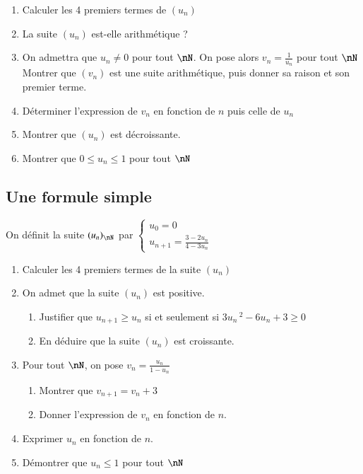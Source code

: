 \documentclass[oneside,12pt]{article}          %
\begin{document}
\begin{enumerate}
    \item Calculer les 4 premiers termes de $(u_n)$
    \item La suite $(u_n)$ est-elle arithmétique ?
    \item On admettra que $u_n\neq 0$ pour tout $\nN$. On pose alors $v_{n}=\frac{1}{u_n}$ pour tout $\nN$
    Montrer que $(v_{n})$ est une suite arithmétique, puis donner sa raison et son premier terme.
    \item Déterminer l'expression de $v_{n}$ en fonction de $n$ puis celle de $u_n$
    \item Montrer que $(u_n)$ est décroissante.
    \item Montrer que $0\leq u_n\leq 1$ pour tout $\nN$
\end{enumerate}



\subsection{Une formule simple}
On définit la suite $(u_n)_{\nN}$ par $\begin{cases}u_0=0\\u_{n+1}=\frac{3-2u_n}{4-3u_n}\end{cases}$
\begin{enumerate}
	\item Calculer les 4 premiers termes de la suite $(u_n)$
	\item On admet que la suite $(u_n)$ est positive.
	\begin{enumerate}
		\item Justifier que $u_{n+1}\geq u_n$ si et seulement si $3u_n\,^2-6u_n+3\geq0$
		\item En déduire que la suite $(u_n)$ est croissante.
	\end{enumerate}
	\item Pour tout $\nN$, on pose $v_n=\frac{u_n}{1-u_n}$
	\begin{enumerate}
		\item Montrer que $v_{n+1}=v_n+3$
		\item Donner l'expression de $v_n$ en fonction de $n$.
	\end{enumerate}
	\item Exprimer $u_n$ en fonction de $n$.
	\item Démontrer que $u_n\leq1$ pour tout $\nN$
\end{enumerate}
\end{document}
